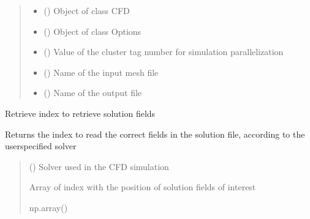 \documentclass[letterpaper,10pt,english]{sphinxmanual}
\begin{document}
\begin{fulllineitems}
\begin{quote}
\begin{description}
\begin{itemize}
\item {} 
\sphinxAtStartPar
{} () \textendash{} Object of class CFD

\item {} 
\sphinxAtStartPar
{} ({\hyperref[\detokenize{modules:configuration.Options}]{}}) \textendash{} Object of class Options

\item {} 
\sphinxAtStartPar
{} () \textendash{} Value of the cluster tag number for simulation parallelization

\item {} 
\sphinxAtStartPar
{} () \textendash{} Name of the input mesh file

\item {} 
\sphinxAtStartPar
{} () \textendash{} Name of the output file

\end{itemize}

\end{description}\end{quote}

\end{fulllineitems}


\begin{fulllineitems}
\label{\detokenize{modules:su2.retrieve_index}}
\pysigstartsignatures
{}
\pysigstopsignatures
\sphinxAtStartPar
Retrieve index to retrieve solution fields

\sphinxAtStartPar
Returns the index to read the correct fields in the solution file, according to the user\sphinxhyphen{}specified solver
\begin{quote}\begin{description}
\sphinxAtStartPar
{} () \textendash{} Solver used in the CFD simulation

\sphinxAtStartPar
{} \textendash{} Array of index with the position of solution fields of interest

\sphinxAtStartPar
np.array()

\end{description}\end{quote}

\end{fulllineitems}
\end{document}
